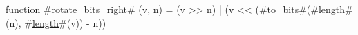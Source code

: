 function #\hyperref[sailRISCVzrotatezybitszyright]{rotate\_bits\_right}# (v, n) =
    (v >> n) | (v << (#\hyperref[sailRISCVztozybits]{to\_bits}#(#\hyperref[sailRISCVzlength]{length}#(n), #\hyperref[sailRISCVzlength]{length}#(v)) - n))
